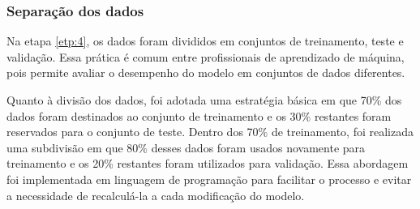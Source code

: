 \subsubsection{Separa\c c\~ao dos dados}\label{subsubsec:divisao}

Na etapa \ref{etp:4}, os dados foram divididos em conjuntos de treinamento, teste e validação. Essa prática é comum entre profissionais de aprendizado de máquina, pois permite avaliar o desempenho do modelo em conjuntos de dados diferentes.

Quanto à divisão dos dados, foi adotada uma estratégia básica em que 70\% dos dados foram destinados ao conjunto de treinamento e os 30\% restantes foram reservados para o conjunto de teste. Dentro dos 70\% de treinamento, foi realizada uma subdivisão em que 80\% desses dados foram usados novamente para treinamento e os 20\% restantes foram utilizados para validação. Essa abordagem foi implementada em linguagem de programação para facilitar o processo e evitar a necessidade de recalculá-la a cada modificação do modelo.